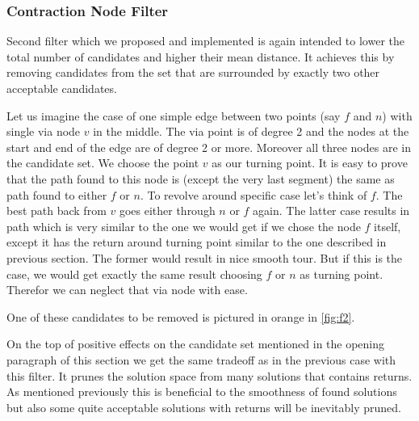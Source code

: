 \documentclass{ctuthesis}
\begin{document}
\subsubsection{Contraction Node Filter} 
Second filter which we proposed and implemented is again intended to lower the total number of candidates and higher their mean distance. It achieves this by removing candidates from the set that are surrounded by exactly two other acceptable candidates. \par
Let us imagine the case of one simple edge between two points (say \(f\) and \(n\)) with single via node \(v\) in the middle. The via point is of degree 2 and the nodes at the start and end of the edge are of degree 2 or more. Moreover all three nodes are in the candidate set. We choose the point \(v\) as our turning point. It is easy to prove that the path found to this node is (except the very last segment) the same as path found to either \(f\) or \(n\). To revolve around specific case let's think of \(f\). The best path back from \(v\) goes either through \(n\) or \(f\) again. The latter case results in path which is very similar to the one we would get if we chose the node \(f\) itself, except it has the return around turning point similar to the one described in previous section. The former would result in nice smooth tour. But if this is the case, we would get exactly the same result choosing \(f\) or \(n\) as turning point. Therefor we can neglect that via node with ease. \par
One of these candidates to be removed is pictured in orange in \ref{fig:f2}. \par
On the top of positive effects on the candidate set mentioned in the opening paragraph of this section we get the same tradeoff as in the previous case with this filter. It prunes the solution space from many solutions that contains returns. As mentioned previously this is beneficial to the smoothness of found solutions but also some quite acceptable solutions with returns will be inevitably pruned.
\end{document}
